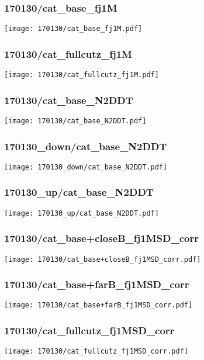 \begin{frame}
   \frametitle{\small 170130/cat\_base\_fj1M}
   \centering
   \texttt{[image: 170130/cat\_base\_fj1M.pdf]}
\end{frame}

\begin{frame}
   \frametitle{\small 170130/cat\_fullcutz\_fj1M}
   \centering
   \texttt{[image: 170130/cat\_fullcutz\_fj1M.pdf]}
\end{frame}

\begin{frame}
   \frametitle{\small 170130/cat\_base\_N2DDT}
   \centering
   \texttt{[image: 170130/cat\_base\_N2DDT.pdf]}
\end{frame}

\begin{frame}
   \frametitle{\small 170130\_down/cat\_base\_N2DDT}
   \centering
   \texttt{[image: 170130\_down/cat\_base\_N2DDT.pdf]}
\end{frame}

\begin{frame}
   \frametitle{\small 170130\_up/cat\_base\_N2DDT}
   \centering
   \texttt{[image: 170130\_up/cat\_base\_N2DDT.pdf]}
\end{frame}

\begin{frame}
   \frametitle{\small 170130/cat\_base+closeB\_fj1MSD\_corr}
   \centering
   \texttt{[image: 170130/cat\_base+closeB\_fj1MSD\_corr.pdf]}
\end{frame}

\begin{frame}
   \frametitle{\small 170130/cat\_base+farB\_fj1MSD\_corr}
   \centering
   \texttt{[image: 170130/cat\_base+farB\_fj1MSD\_corr.pdf]}
\end{frame}

\begin{frame}
   \frametitle{\small 170130/cat\_fullcutz\_fj1MSD\_corr}
   \centering
   \texttt{[image: 170130/cat\_fullcutz\_fj1MSD\_corr.pdf]}
\end{frame}

